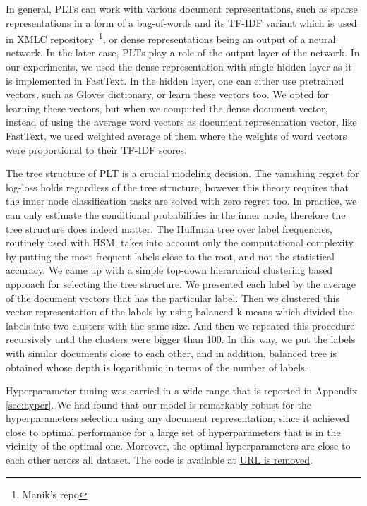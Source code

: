 \documentclass{article}
\newcommand{\Algo}[1]{\textsc{#1}}
\begin{document}
In general, \Algo{PLT}s can work with various document representations, such as sparse representations in a form of a bag-of-words and its TF-IDF variant which is used in XMLC repository~\footnote{Manik's repo}, or dense representations being an output of a neural network. In the later case, \Algo{PLT}s play a role of the output layer of the network. 
In our experiments, we used the dense representation with single hidden layer as it is implemented in FastText. In the hidden layer, one can either use pretrained vectors, such as Gloves dictionary, or learn these vectors too. We opted for learning these vectors, but when we computed the dense document vector, instead of using the average word vectors as document representation vector, like FastText, we used weighted average of them where the weights of word vectors were proportional to their TF-IDF scores.

The tree structure of PLT is a crucial modeling decision. The vanishing regret for log-loss holds regardless of the tree structure, however this theory requires that the inner node classification tasks are solved with zero regret too. In practice, we can only estimate the conditional probabilities in the inner node, therefore the tree structure does indeed matter. The Huffman tree over label frequencies, routinely used with HSM, takes into account only the computational complexity by putting the most frequent labels close to the root, and not the statistical accuracy. We came up with a simple top-down hierarchical clustering based approach for selecting the tree structure. We presented each label by the average of the document vectors that has the particular label. Then we clustered this vector representation of the labels by using balanced k-means which divided the labels into two clusters with the same size. And then we repeated this procedure recursively until the clusters were bigger than 100. In this way, we put the labels with similar documents close to each other, and in addition, balanced tree is obtained whose depth is logarithmic in terms of the number of labels.

Hyperparameter tuning was carried in a wide range that is reported in Appendix \ref{sec:hyper}. We had found that our model is remarkably robust for the hyperparameters selection using any document representation, since it achieved close to optimal performance for a large set of hyperparameters that is in the vicinity of the optimal one. Moreover, the optimal hyperparameters are close to each other across all dataset. The code is available at \url{URL is removed}.
\end{document}
